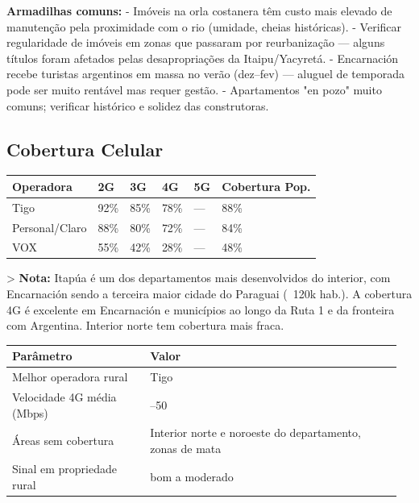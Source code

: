 \textbf{Armadilhas comuns:}
- Imóveis na orla costanera têm custo mais elevado de manutenção pela proximidade com o rio (umidade, cheias históricas).
- Verificar regularidade de imóveis em zonas que passaram por reurbanização --- alguns títulos foram afetados pelas desapropriações da Itaipu/Yacyretá.
- Encarnación recebe turistas argentinos em massa no verão (dez--fev) --- aluguel de temporada pode ser muito rentável mas requer gestão.
- Apartamentos "en pozo" muito comuns; verificar histórico e solidez das construtoras.




\subsection{Cobertura Celular}



{\small
\setlength{\tabcolsep}{3pt}
\renewcommand{\arraystretch}{1.12}
{\small
\begin{tabularx}{\linewidth}{lXXXXX}
\toprule
Operadora & 2G & 3G & 4G & 5G & Cobertura Pop. \\
\midrule
Tigo & 92\% & 85\% & 78\% & --- & 88\% \\
Personal/Claro & 88\% & 80\% & 72\% & --- & 84\% \\
VOX & 55\% & 42\% & 28\% & --- & 48\% \\
\bottomrule
\end{tabularx}
}
}

> \textbf{Nota:} Itapúa é um dos departamentos mais desenvolvidos do interior, com Encarnación sendo a terceira maior cidade do Paraguai (~120k hab.). A cobertura 4G é excelente em Encarnación e municípios ao longo da Ruta 1 e da fronteira com Argentina. Interior norte tem cobertura mais fraca.


{\small
\setlength{\tabcolsep}{3pt}
\renewcommand{\arraystretch}{1.12}
\begin{tabularx}{\linewidth}{>{\raggedright\arraybackslash}p{0.34\linewidth} >{\raggedright\arraybackslash}p{0.62\linewidth}}
\toprule
Parâmetro & Valor \\
\midrule
Melhor operadora rural & Tigo \\
Velocidade 4G média (Mbps) & 25--50 \\
Áreas sem cobertura & Interior norte e noroeste do departamento, zonas de mata \\
Sinal em propriedade rural & bom a moderado \\
\bottomrule
\end{tabularx}
}


